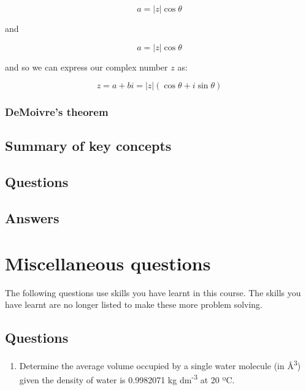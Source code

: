 \documentclass[
]{book}
\providecommand{\tightlist}{%
  \setlength{\itemsep}{0pt}\setlength{\parskip}{0pt}}
\begin{document}
\begin{equation*}
a = |z| \cos \theta
\end{equation*}

and

\begin{equation*}
a = |z| \cos \theta
\end{equation*}

and so we can express our complex number \(z\) as:

\begin{equation*}
z = a+bi = |z| (\cos \theta + i \sin \theta)
\end{equation*}

\hypertarget{demoivres-theorem}{%
\subsection{DeMoivre's theorem}\label{demoivres-theorem}}

\hypertarget{sec:Summary7}{%
\section{Summary of key concepts}\label{sec:Summary7}}

\hypertarget{sec:questions7}{%
\section{Questions}\label{sec:questions7}}

\hypertarget{sec:answers7}{%
\section{Answers}\label{sec:answers7}}

\hypertarget{ch:questions}{%
\chapter{Miscellaneous questions}\label{ch:questions}}

The following questions use skills you have learnt in this course. The skills you have learnt are no longer listed to make these more problem solving.

\hypertarget{questions}{%
\section{Questions}\label{questions}}

\begin{enumerate}
\def\labelenumi{\arabic{enumi}.}
\tightlist
\item
  Determine the average volume occupied by a single water molecule (in Å\textsuperscript{3}) given the density of water is 0.9982071 kg dm\textsuperscript{-3} at 20 ºC.
\end{enumerate}
\end{document}
